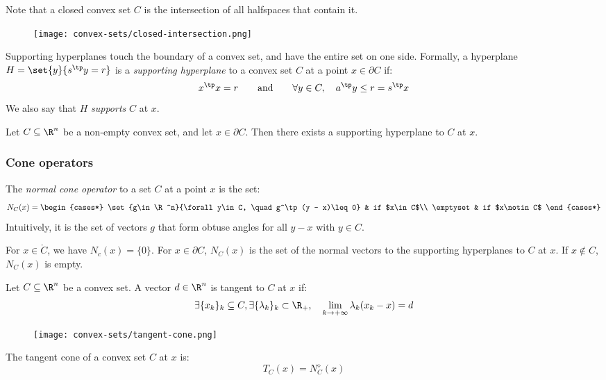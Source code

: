 Note that a closed convex set $C$ is the intersection of all halfspaces that contain it.
\begin{figure}[H]
    \centering
    \texttt{[image: convex-sets/closed-intersection.png]}
\end{figure}

\begin{definition}
    Supporting hyperplanes touch the boundary of a convex set, and have the entire set on one side. Formally, a hyperplane $H = \set{y}{s^\tp y=r}$ is a \emph{supporting hyperplane} to a convex set $C$ at a point $x\in\partial C$ if:
    \begin{equation*}
        x^\tp x = r \qquad \text{and} \qquad \forall y\in C, \quad a^\tp y\leq r = s^\tp x
    \end{equation*}
    We also say that $H$ \emph{supports} $C$ at $x$.
\end{definition}

\begin{property}
    Let $C\subseteq\R^n$ be a non-empty convex set, and let $x\in\partial C$. Then there exists a supporting hyperplane to $C$ at $x$.
\end{property}

\subsubsection{Cone operators}
\begin{definition}
    The \emph{normal cone operator} to a set $C$ at a point $x$ is the set:
    \begin{equation*}
        N_C(x) = \begin{cases*}
            \set{g\in\R^n}{\forall y\in C, \quad g^\tp(y - x)\leq 0} & if $x\in C$\\
            \emptyset & if $x\notin C$
        \end{cases*}
    \end{equation*}
    Intuitively, it is the set of vectors $g$ that form obtuse angles for all $y-x$ with $y\in C$.
\end{definition}

For $x\in \mathring{C}$, we have $N_c(x)=\{0\}$. For $x\in\partial C$, $N_C(x)$ is the set of the normal vectors to the supporting hyperplanes to $C$ at $x$. If $x\notin C$, $N_C(x)$ is empty.

\begin{definition}
    Let $C\subseteq\R^n$ be a convex set. A vector $d\in\R^n$ is tangent to $C$ at $x$ if:
    \begin{equation*}
        \exists \{x_k\}_k\subseteq C, \exists \{\lambda_k\}_k\subset\R_+, \quad \lim_{k\to+\infty} \lambda_k (x_k-x) = d
    \end{equation*}
\end{definition}
\begin{figure}[H]
    \centering
    \texttt{[image: convex-sets/tangent-cone.png]}
\end{figure}

\begin{definition}
    The tangent cone of a convex set $C$ at $x$ is:
    \begin{equation*}
        T_C(x) = N_C^\diamond(x)
    \end{equation*}
\end{definition}